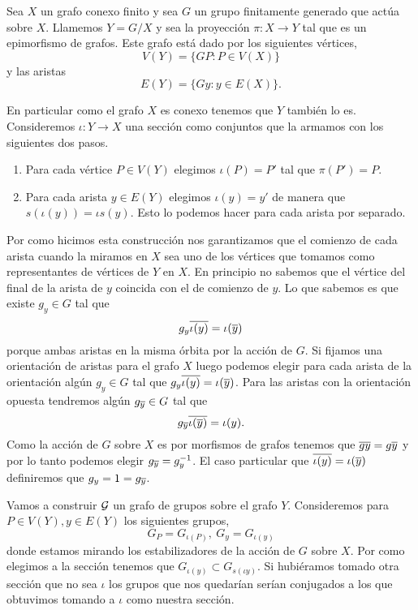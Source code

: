 \documentclass[tesis.tex]{subfiles}
\begin{document}
Sea $X$ un grafo conexo finito y sea $G$ un grupo finitamente generado que actúa sobre $X$.
Llamemos $Y = G / X$ y sea la proyección $\pi: X \to Y$ tal que es un epimorfismo de grafos.
Este grafo está dado por los siguientes vértices,
\[
	V(Y) = \{ G P :  P \in V(X)    \}
\]
y las  aristas 
\[
	E(Y) = \{  Gy  : y \in E(X)  \}.
\]

En particular como el grafo $X$ es conexo tenemos que $Y$ también lo es.
Consideremos $\iota: Y \to X$ una sección como conjuntos que la armamos con los siguientes dos pasos.
\begin{enumerate}
	\item Para cada vértice $P \in V(Y)$ elegimos $\iota (P) = P'$ tal que $\pi(P') = P$.
	\item Para cada arista $y \in E(Y)$ elegimos $\iota(y) = y'$ de manera que $s(\iota(y)) = \iota s(y)$. 
	Esto lo podemos hacer para cada arista por separado.
\end{enumerate}

Por como hicimos esta construcción nos garantizamos que el comienzo de cada arista cuando la miramos en $X$ sea uno de los vértices que tomamos como representantes de vértices de $Y$ en $X$.
En principio no sabemos que el vértice del final de la arista de $y$ coincida con el de comienzo de $y$. 
Lo que sabemos es que existe $g_y \in G$ tal que 
\[
	g_y \overline{\iota (y)} = \iota (\overline y)
\]
porque ambas aristas en la misma órbita por la acción de $G$.
Si fijamos una orientación de aristas para el grafo $X$ luego podemos elegir para cada arista de la orientación algún $g_y \in G$ tal que $g_y \overline{\iota (y)} = \iota (\overline y)$.
Para las aristas con la orientación opuesta tendremos algún $g_{\overline y} \in G$ tal que 
\[
	g_{\overline y} \overline{\iota(\overline y)} = \iota(y).
\]
Como la acción de $G$ sobre $X$ es por morfismos de grafos tenemos que $\overline {g y} = g \overline y$ y por lo tanto podemos elegir $g_{\overline y} = g_{y}^{-1}$.
El caso particular que $\overline{\iota (y)} = \iota (\overline y)$ definiremos que $g_y = 1 = g_{\overline y}$.

Vamos a construir ${\cal G}$ un grafo de grupos sobre el grafo $Y$.
Consideremos para $P \in V(Y), y \in E(Y)$ los siguientes grupos,
\[
	G_P = G_{\iota (P)}, \ G_y = G_{\iota(y)}
\]
donde estamos mirando los estabilizadores de la acción de $G$ sobre $X$.
Por como elegimos a la sección tenemos que $G_{\iota(y)} \subset G_{s(\iota y)}$. 
Si hubiéramos tomado otra sección que no sea $\iota$ los grupos que nos quedarían serían conjugados a los que obtuvimos tomando a $\iota$ como nuestra sección.
\end{document}
